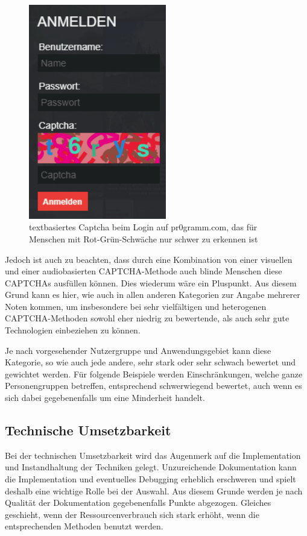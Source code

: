 \begin{figure}[h!]
    \centering
    \includegraphics[width=6cm]{gfx/mygraphics/pr0grammcaptcha.png}
    \caption{textbasiertes Captcha beim Login auf pr$0$gramm.com, das für Menschen mit Rot-Grün-Schwäche nur schwer zu erkennen ist}
\end{figure}

Jedoch ist auch zu beachten, dass durch eine Kombination von einer visuellen 
und einer audiobasierten CAPTCHA-Methode auch blinde Menschen diese CAPTCHAs ausfüllen können. 
Dies wiederum wäre ein Pluspunkt. 
Aus diesem Grund kann es hier, wie auch in allen anderen Kategorien zur Angabe mehrerer Noten kommen,
um insbesondere bei sehr vielfältigen und heterogenen CAPTCHA-Methoden sowohl eher niedrig zu bewertende, 
als auch sehr gute Technologien einbeziehen zu können.

Je nach vorgesehender Nutzergruppe und Anwendungsgebiet kann diese Kategorie, so wie auch jede andere, 
sehr stark oder sehr schwach bewertet und gewichtet werden.
Für folgende Beispiele werden Einschränkungen, welche ganze Personengruppen betreffen, entsprechend schwerwiegend bewertet,
auch wenn es sich dabei gegebenenfalls um eine Minderheit handelt.

\subsection{Technische Umsetzbarkeit}
\label{ch:matrix:aspekte:tu}

Bei der technischen Umsetzbarkeit wird das Augenmerk auf die Implementation und Instandhaltung der Techniken gelegt.
Unzureichende Dokumentation kann die Implementation und eventuelles Debugging erheblich erschweren
und spielt deshalb eine wichtige Rolle bei der Auswahl.
Aus diesem Grunde werden je nach Qualität der Dokumentation gegebenenfalls Punkte abgezogen.
Gleiches geschieht, wenn der Ressourcenverbrauch sich stark erhöht, wenn die entsprechenden Methoden benutzt werden.

